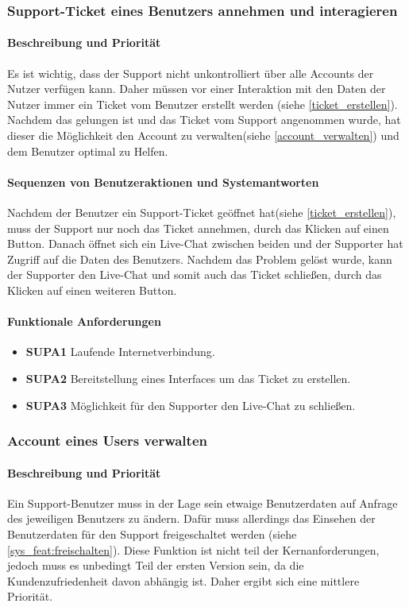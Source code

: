 \subsubsection{Support-Ticket eines Benutzers annehmen und interagieren}
\paragraph{Beschreibung und Priorität}
Es ist wichtig, dass der Support nicht unkontrolliert über alle Accounts der Nutzer verfügen kann. Daher müssen vor einer Interaktion mit den Daten der Nutzer immer ein Ticket vom Benutzer erstellt werden (siehe \ref{ticket_erstellen}).
Nachdem das gelungen ist und das Ticket vom Support angenommen wurde, hat dieser die Möglichkeit den Account zu verwalten(siehe \ref{account_verwalten}) und dem Benutzer optimal zu Helfen.
\paragraph{Sequenzen von Benutzeraktionen und Systemantworten}
Nachdem der Benutzer ein Support-Ticket geöffnet hat(siehe \ref{ticket_erstellen}), muss der Support nur noch das Ticket annehmen, durch das Klicken auf einen Button. Danach öffnet sich ein Live-Chat zwischen beiden und der Supporter hat Zugriff auf die Daten des Benutzers. Nachdem das Problem gelöst wurde, kann der Supporter den Live-Chat und somit auch das Ticket schließen, durch das Klicken auf einen weiteren Button.
\paragraph{Funktionale Anforderungen}
\begin{itemize}
	\item \textbf{SUPA1} Laufende Internetverbindung.
	\item \textbf{SUPA2} Bereitstellung eines Interfaces um das Ticket zu erstellen.
	\item \textbf{SUPA3} Möglichkeit für den Supporter den Live-Chat zu schließen. 
\end{itemize}

\subsubsection{Account eines Users verwalten}
\paragraph{Beschreibung und Priorität}
Ein Support-Benutzer muss in der Lage sein etwaige Benutzerdaten auf Anfrage des jeweiligen Benutzers zu ändern. Dafür muss allerdings das Einsehen der Benutzerdaten für den Support freigeschaltet werden (siehe \ref{sys_feat:freischalten}). Diese Funktion ist nicht teil der Kernanforderungen, jedoch muss es unbedingt Teil der ersten Version sein, da die Kundenzufriedenheit davon abhängig ist. Daher ergibt sich eine mittlere Priorität.
